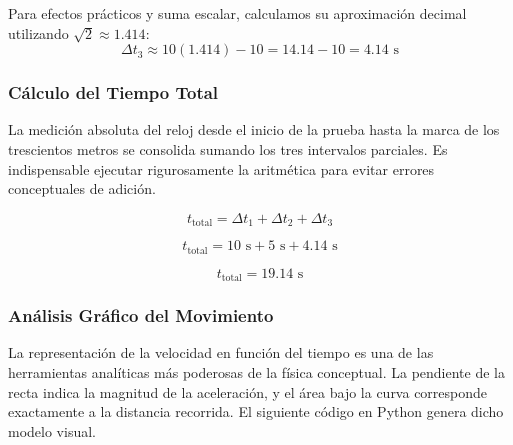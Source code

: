 \documentclass[12pt, a4paper]{article}
\begin{document}
Para efectos prácticos y suma escalar, calculamos su aproximación decimal utilizando $\sqrt{2} \approx 1.414$:
\begin{equation}
\Delta t_3 \approx 10(1.414) - 10 = 14.14 - 10 = 4.14 \text{ s}
\end{equation}

\subsubsection*{Cálculo del Tiempo Total}

La medición absoluta del reloj desde el inicio de la prueba hasta la marca de los trescientos metros se consolida sumando los tres intervalos parciales. Es indispensable ejecutar rigurosamente la aritmética para evitar errores conceptuales de adición.

\begin{equation}
t_{\text{total}} = \Delta t_1 + \Delta t_2 + \Delta t_3
\end{equation}

\begin{equation}
t_{\text{total}} = 10 \text{ s} + 5 \text{ s} + 4.14 \text{ s}
\end{equation}

\begin{equation}
t_{\text{total}} = 19.14 \text{ s}
\end{equation}

\subsubsection*{Análisis Gráfico del Movimiento}

La representación de la velocidad en función del tiempo es una de las herramientas analíticas más poderosas de la física conceptual. La pendiente de la recta indica la magnitud de la aceleración, y el área bajo la curva corresponde exactamente a la distancia recorrida. El siguiente código en Python genera dicho modelo visual.
\end{document}
